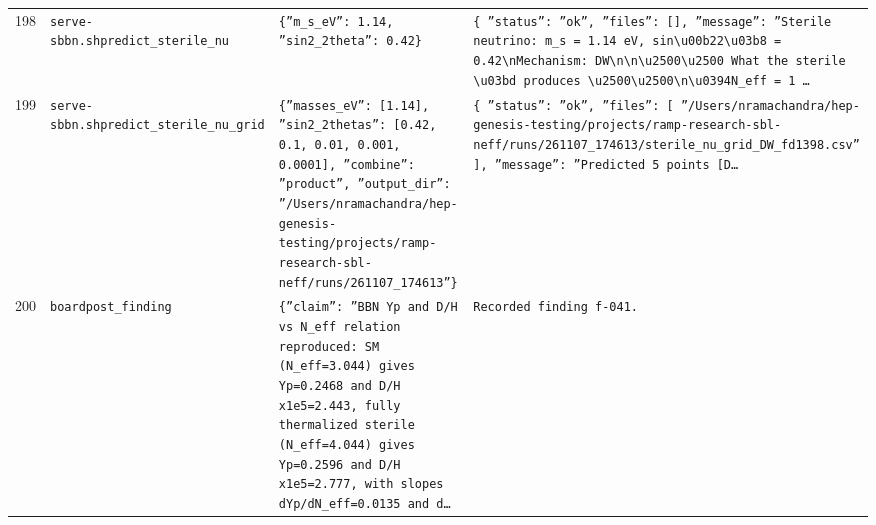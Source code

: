 \documentclass[11pt,a4paper]{article}
\begin{document}
\begin{longtable}{@{}p{}p{}p{}p{}@{}}
198 & \texttt{serve-sbbn.sh}\newline\texttt{predict\_\allowbreak{}sterile\_\allowbreak{}nu} & \texttt{\{''m\_\allowbreak{}s\_\allowbreak{}eV'':\allowbreak{} 1.14,\allowbreak{} ''sin2\_\allowbreak{}2theta'':\allowbreak{} 0.42\}\allowbreak{}} & \texttt{\{   ''status'':\allowbreak{} ''ok'',\allowbreak{}   ''files'':\allowbreak{} []\allowbreak{},\allowbreak{}   ''message'':\allowbreak{} ''Sterile neutrino:\allowbreak{} m\_\allowbreak{}s =\allowbreak{} 1.14 eV,\allowbreak{} sin\textbackslash{}\allowbreak{}u00b22\textbackslash{}\allowbreak{}u03b8 =\allowbreak{} 0.42\textbackslash{}\allowbreak{}nMechanism:\allowbreak{} DW\textbackslash{}\allowbreak{}n\textbackslash{}\allowbreak{}n\textbackslash{}\allowbreak{}u2500\textbackslash{}\allowbreak{}u2500 What the sterile \textbackslash{}\allowbreak{}u03bd produces \textbackslash{}\allowbreak{}u2500\textbackslash{}\allowbreak{}u2500\textbackslash{}\allowbreak{}n\textbackslash{}\allowbreak{}u0394N\_\allowbreak{}eff =\allowbreak{} 1 \ldots{}\allowbreak{}} \\
199 & \texttt{serve-sbbn.sh}\newline\texttt{predict\_\allowbreak{}sterile\_\allowbreak{}nu\_\allowbreak{}grid} & \texttt{\{''masses\_\allowbreak{}eV'':\allowbreak{} [1.14]\allowbreak{},\allowbreak{} ''sin2\_\allowbreak{}2thetas'':\allowbreak{} [0.42,\allowbreak{} 0.1,\allowbreak{} 0.01,\allowbreak{} 0.001,\allowbreak{} 0.0001]\allowbreak{},\allowbreak{} ''combine'':\allowbreak{} ''product'',\allowbreak{} ''output\_\allowbreak{}dir'':\allowbreak{} ''/\allowbreak{}Users/\allowbreak{}nramachandra/\allowbreak{}hep-genesis-testing/\allowbreak{}projects/\allowbreak{}ramp-research-sbl-neff/\allowbreak{}runs/\allowbreak{}261107\_\allowbreak{}174613''\}\allowbreak{}} & \texttt{\{   ''status'':\allowbreak{} ''ok'',\allowbreak{}   ''files'':\allowbreak{} [     ''/\allowbreak{}Users/\allowbreak{}nramachandra/\allowbreak{}hep-genesis-testing/\allowbreak{}projects/\allowbreak{}ramp-research-sbl-neff/\allowbreak{}runs/\allowbreak{}261107\_\allowbreak{}174613/\allowbreak{}sterile\_\allowbreak{}nu\_\allowbreak{}grid\_\allowbreak{}DW\_\allowbreak{}fd1398.csv''   ]\allowbreak{},\allowbreak{}   ''message'':\allowbreak{} ''Predicted 5 points [D\ldots{}\allowbreak{}} \\
200 & \texttt{board}\newline\texttt{post\_\allowbreak{}finding} & \texttt{\{''claim'':\allowbreak{} ''BBN Yp and D/\allowbreak{}H vs N\_\allowbreak{}eff relation reproduced:\allowbreak{} SM (N\_\allowbreak{}eff=\allowbreak{}3.044)\allowbreak{} gives Yp=\allowbreak{}0.2468 and D/\allowbreak{}H x1e5=\allowbreak{}2.443,\allowbreak{} fully thermalized sterile (N\_\allowbreak{}eff=\allowbreak{}4.044)\allowbreak{} gives Yp=\allowbreak{}0.2596 and D/\allowbreak{}H x1e5=\allowbreak{}2.777,\allowbreak{} with slopes dYp/\allowbreak{}dN\_\allowbreak{}eff=\allowbreak{}0.0135 and d\ldots{}\allowbreak{}} & \texttt{Recorded finding f-041.} \\

\end{longtable}
\end{document}
